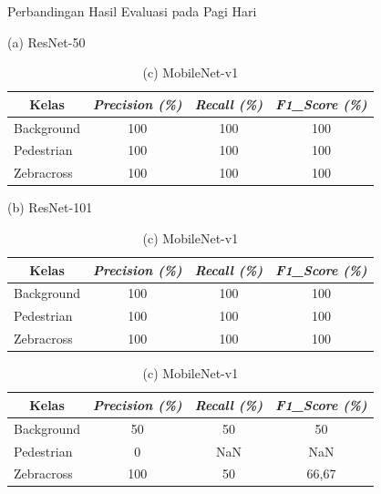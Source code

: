 \begin{table}[!h]
	\centering
	\caption{{Perbandingan Hasil Evaluasi pada Pagi Hari}}
	\begin{minipage}[b]{\textwidth}
		\centering
		\caption*{(a) ResNet-50}
		\begin{tabular}{|l|c|c|c|}
			\hline
			\multicolumn{1}{|c|}{\textbf{Kelas}} & \textit{\textbf{Precision (\%)}} & \textit{\textbf{Recall (\%)}} & \textit{\textbf{F1\_Score (\%)}} \\ \hline
			Background                           & 100                              & 100                           & 100                              \\ \hline
			Pedestrian                           & 100                              & 100                           & 100                              \\ \hline
			Zebracross                           & 100                              & 100                           & 100                              \\ \hline
		\end{tabular}
	\end{minipage}
	\vfill
	\begin{minipage}[b]{\textwidth}
		\centering
		\caption*{(b) ResNet-101}
		\begin{tabular}{|l|c|c|c|}
			\hline
			\multicolumn{1}{|c|}{\textbf{Kelas}} & \textit{\textbf{Precision (\%)}} & \textit{\textbf{Recall (\%)}} & \textit{\textbf{F1\_Score (\%)}} \\ \hline
			Background                           & 100                              & 100                           & 100                              \\ \hline
			Pedestrian                           & 100                              & 100                           & 100                              \\ \hline
			Zebracross                           & 100                              & 100                           & 100                              \\ \hline
			
		\end{tabular}
	\end{minipage}
	\vfill
	\begin{minipage}[b]{\textwidth}
		\centering
		\caption*{(c) MobileNet-v1}
		\begin{tabular}{|l|c|c|c|}
			\hline
			\multicolumn{1}{|c|}{\textbf{Kelas}} & \textit{\textbf{Precision (\%)}} & \textit{\textbf{Recall (\%)}} & \textit{\textbf{F1\_Score (\%)}} \\ \hline
			Background                           & 50                               & 50                         & 50                               \\ \hline
			Pedestrian                           & 0                                & NaN                           & NaN                              \\ \hline
			Zebracross                           & 100                              & 50                            & 66,67                            \\ \hline
			

\end{tabular}
\end{minipage}
\end{table}
